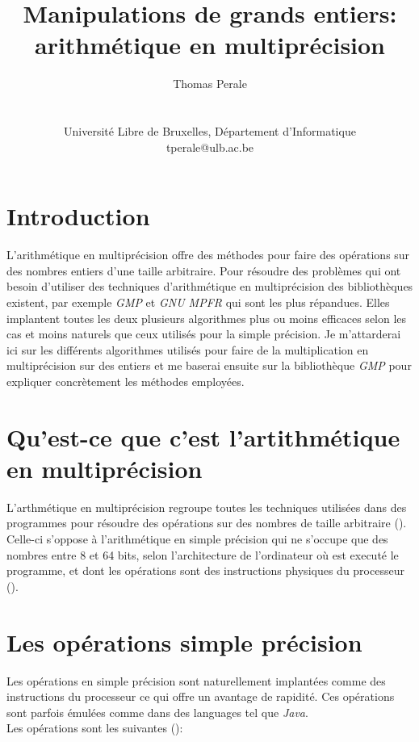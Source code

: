 \documentclass[letterpaper]{article}
\title{Manipulations de grands entiers: arithmétique en multiprécision}
\author{Thomas Perale\\
    \mbox{}\\\\
    Université Libre de Bruxelles, Département d'Informatique\\
    tperale@ulb.ac.be\\
}
\begin{document}
\maketitle

\section{Introduction}

L'arithmétique en multiprécision offre des méthodes pour faire des opérations
sur des nombres entiers d'une taille arbitraire. Pour résoudre des problèmes
qui ont besoin d'utiliser des techniques d'arithmétique en multiprécision des
bibliothèques existent, par exemple \emph{GMP} et \emph{GNU MPFR} qui sont les plus
répandues. Elles implantent toutes les deux plusieurs algorithmes plus ou moins
efficaces selon les cas et moins naturels que ceux utilisés pour la simple
précision.
Je m'attarderai ici sur les différents algorithmes utilisés pour faire de
la multiplication en multiprécision sur des entiers et me baserai ensuite sur
la bibliothèque \emph{GMP} pour expliquer concrètement les méthodes employées.

\section{Qu'est-ce que c'est l'artithmétique en multiprécision}

L'arthmétique en multiprécision regroupe toutes les techniques utilisées dans des
programmes pour résoudre des opérations sur des nombres de taille
arbitraire (\cite{wikimultiprecision}).
Celle-ci s'oppose à l'arithmétique en simple précision qui ne s'occupe que des
nombres entre 8 et 64 bits, selon l'architecture de l'ordinateur où est executé
le programme, et dont les opérations sont des instructions physiques du
processeur (\cite{wikimultiprecision}).

\section{Les opérations simple précision}

Les opérations en simple précision sont naturellement implantées comme des
instructions du processeur ce qui offre un avantage de rapidité. Ces opérations
sont parfois émulées comme dans des languages tel que \emph{Java}.\\

Les opérations sont les suivantes (\cite{wikialu}):
\end{document}
